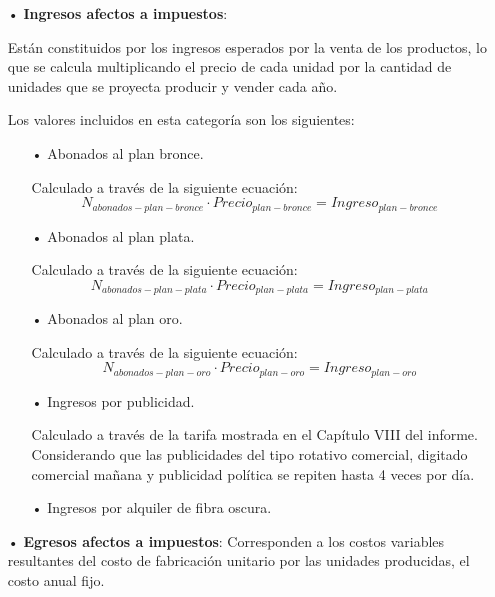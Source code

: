 \begin{enumerate}
\item[•]\textbf{Ingresos afectos a impuestos}:

Están constituidos por los ingresos esperados por la 
venta de los productos, lo que se calcula multiplicando el precio de cada unidad por 
la cantidad de unidades que se proyecta producir y vender cada año.

Los valores incluidos en esta categoría son los siguientes:
\begin{enumerate}
\item[•]Abonados al plan bronce.

Calculado a través de la siguiente ecuación:
\begin{equation}
N_{abonados-plan-bronce}\cdot Precio_{plan-bronce}=Ingreso_{plan-bronce}
\end{equation}

\item[•]Abonados al plan plata.

Calculado a través de la siguiente ecuación:
\begin{equation}
N_{abonados-plan-plata}\cdot Precio_{plan-plata}=Ingreso_{plan-plata}
\end{equation}

\item[•]Abonados al plan oro.

Calculado a través de la siguiente ecuación:
\begin{equation}
N_{abonados-plan-oro}\cdot Precio_{plan-oro}=Ingreso_{plan-oro}
\end{equation}

\item[•]Ingresos por publicidad.

Calculado a través de la tarifa mostrada en el Capítulo VIII del informe. Considerando que las publicidades del tipo
rotativo comercial, digitado comercial mañana y publicidad política se repiten hasta 4 veces por día.



\item[•]Ingresos por alquiler de fibra oscura.






\end{enumerate}

\item[•]\textbf{Egresos afectos a impuestos}:
Corresponden a los costos variables resultantes del 
costo de fabricación unitario por las unidades producidas, el costo anual fijo.


\end{enumerate}
